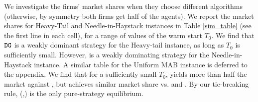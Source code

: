 \documentclass[../competing_bandits.tex]{subfiles}
\begin{document}




We investigate the firms' market shares when they choose different algorithms (otherwise, by symmetry both firms get half of the agents). We report the market shares for Heavy-Tail and Needle-in-Haystack instances in Table \ref{sim_table}  (see the first line in each cell), for a range of values of the warm start $T_0$. We find that $\mathtt{DG}$ is a weakly dominant strategy for the Heavy-tail instance, as long as $T_0$ is sufficiently small. However, \TS is a weakly dominating strategy for the Needle-in-Haystack instance. A similar table for the Uniform MAB instance is deferred to the appendix. We find that for a sufficiently small $T_0$, \DG yields more than half the market against \TS,  but achieves similar market share vs. \DG and \DEG. By our tie-breaking rule, (\DG,\DG) is the only pure-strategy equilibrium.
\end{document}
